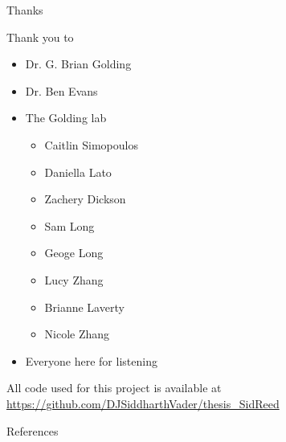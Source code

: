 \documentclass[dvipsnames]{beamer}
\newcommand{\myurl}[2][blue]{{\color{#1}\url{#2}}}
\begin{document}
\begin{frame}{Thanks}
    \begin{multicols}{2}
    \begin{minipage}[b][40ex][t]{\linewidth}
    Thank you to
    \begin{itemize}
        \item Dr. G. Brian Golding
        \item Dr. Ben Evans
        \item The Golding lab
            \begin{itemize}
                \item Caitlin Simopoulos
                \item Daniella Lato
                \item Zachery Dickson
                \item Sam Long
                \item Geoge Long
                \item Lucy Zhang
                \item Brianne Laverty
                \item Nicole Zhang
            \end{itemize}
        \item Everyone here for listening
    \end{itemize}
    \end{minipage}
    \begin{minipage}[b][20ex][t]{\linewidth}
    \begin{figure}[htb!]
    \end{figure}
    \end{minipage}
    \begin{minipage}[b][20ex][t]{\linewidth}
        \vspace{0.1in}
        All code used for this project is available at
        \myurl[blue]{https://github.com/DJSiddharthVader/thesis_SidReed}
    \end{minipage}
    \end{multicols}
\end{frame}
\begin{frame}{References}
    \printbibliography
\end{frame}
\end{document}
